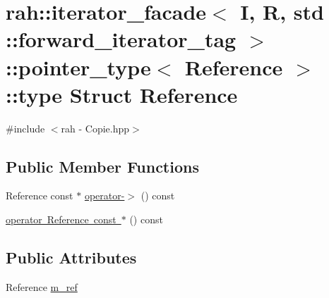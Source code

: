 \hypertarget{structrah_1_1iterator__facade_3_01_i_00_01_r_00_01std_01_1_1forward__iterator__tag_01_4_1_1pointer__type_1_1type}{}\section{rah\+::iterator\+\_\+facade$<$ I, R, std \+::forward\+\_\+iterator\+\_\+tag $>$\+::pointer\+\_\+type$<$ Reference $>$\+::type Struct Reference}
\label{structrah_1_1iterator__facade_3_01_i_00_01_r_00_01std_01_1_1forward__iterator__tag_01_4_1_1pointer__type_1_1type}


{\ttfamily \#include $<$rah -\/ Copie.\+hpp$>$}

\subsection*{Public Member Functions}
\begin{DoxyCompactItemize}
\item 
Reference const  $\ast$ \mbox{\hyperlink{structrah_1_1iterator__facade_3_01_i_00_01_r_00_01std_01_1_1forward__iterator__tag_01_4_1_1pointer__type_1_1type_a36b34a6ab6d3893c934eec6b80ff9a7e}{operator-\/$>$}} () const
\item 
\mbox{\hyperlink{structrah_1_1iterator__facade_3_01_i_00_01_r_00_01std_01_1_1forward__iterator__tag_01_4_1_1pointer__type_1_1type_a7f16096c7a5c692f13c200d35407982f}{operator Reference const $\ast$}} () const
\end{DoxyCompactItemize}
\subsection*{Public Attributes}
\begin{DoxyCompactItemize}
\item 
Reference \mbox{\hyperlink{structrah_1_1iterator__facade_3_01_i_00_01_r_00_01std_01_1_1forward__iterator__tag_01_4_1_1pointer__type_1_1type_a41af4fce18669376c37ebb84ca7de727}{m\+\_\+ref}}
\end{DoxyCompactItemize}


